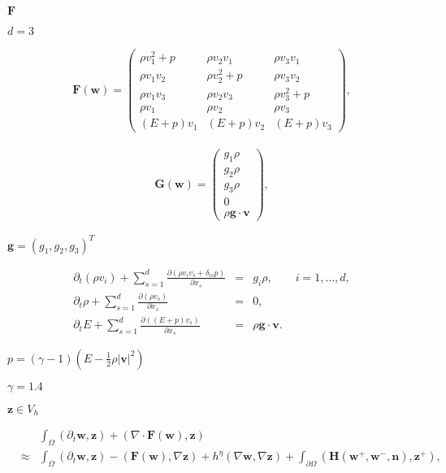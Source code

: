 \documentclass{article}
\begin{document}
$\mathbf F$
\pagebreak

$d=3$
\pagebreak

\begin{eqnarray*} \mathbf F(\mathbf w) = \left( \begin{array}{ccc} \rho v_1^2+p & \rho v_2v_1 & \rho v_3v_1 \\ \rho v_1v_2 & \rho v_2^2+p & \rho v_3v_2 \\ \rho v_1v_3 & \rho v_2v_3 & \rho v_3^2+p \\ \rho v_1 & \rho v_2 & \rho v_3 \\ (E+p) v_1 & (E+p) v_2 & (E+p) v_3 \end{array} \right), \end{eqnarray*}
\pagebreak

\begin{eqnarray*} \mathbf G(\mathbf w) = \left( \begin{array}{c} g_1\rho \\ g_2\rho \\ g_3\rho \\ 0 \\ \rho \mathbf g \cdot \mathbf v \end{array} \right), \end{eqnarray*}
\pagebreak

$\mathbf g=(g_1,g_2,g_3)^T$
\pagebreak

\begin{eqnarray*} \partial_t (\rho v_i) + \sum_{s=1}^d \frac{\partial(\rho v_i v_s + \delta_{is} p)}{\partial x_s} &=& g_i \rho, \qquad i=1,\dots,d, \\ \partial_t \rho + \sum_{s=1}^d \frac{\partial(\rho v_s)}{\partial x_s} &=& 0, \\ \partial_t E + \sum_{s=1}^d \frac{\partial((E+p)v_s)}{\partial x_s} &=& \rho \mathbf g \cdot \mathbf v. \end{eqnarray*}
\pagebreak

$p = (\gamma -1)(E-\frac{1}{2} \rho |\mathbf v|^2)$
\pagebreak

$\gamma=1.4$
\pagebreak

$\mathbf{z} \in V_h$
\pagebreak

\begin{eqnarray*} &&\int_{\Omega} (\partial_t \mathbf{w}, \mathbf{z}) + (\nabla \cdot \mathbf{F}(\mathbf{w}), \mathbf{z}) \\ &\approx &\int_{\Omega} (\partial_t \mathbf{w}, \mathbf{z}) - (\mathbf{F}(\mathbf{w}), \nabla \mathbf{z}) + h^{\eta}(\nabla \mathbf{w} , \nabla \mathbf{z}) + \int_{\partial \Omega} (\mathbf{H}(\mathbf{w}^+, \mathbf{w}^-, \mathbf{n}), \mathbf{z}^+), \end{eqnarray*}
\pagebreak
\end{document}
